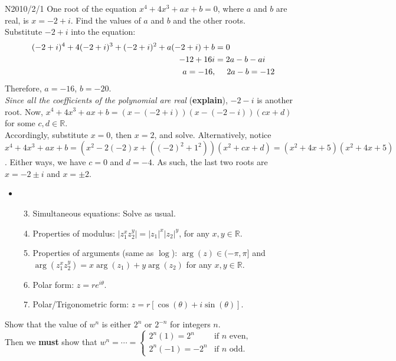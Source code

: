 \documentclass[oneside]{book}
\begin{document}
        \begin{example}{N2010/2/1}{}
          One root of the equation \(x^4+4x^3+ax+b=0\), where \(a\) and \(b\) are real, is \(x=-2+i\). Find the values of \(a\) and \(b\) and the other roots.\\[3mm]
          Substitute \(-2+i\) into the equation:
          \begin{align*}
            (-2+i)^4+4(-2+i)^3+(-2+i)^2+a(-2+i)+b&=0\\
            -12+16i&=2a-b-ai\\
            a=-16, &\hphantom{=}\ \ 2a-b=-12
          \end{align*}
          Therefore, \(a=-16\), \(b=-20\).\\[3mm]
          \emph{Since all the coefficients of the polynomial are real} (\textbf{explain}), \(-2-i\) is another root. Now, \(x^4+4x^3+ax+b=(x-(-2+i))(x-(-2-i))(cx+d)\) for some \(c,d \in \mathbb{R}\).\\[3mm]
          Accordingly, substitute \(x=0\), then \(x=2\), and solve. Alternatively, notice \(x^4+4x^3+ax+b=(x^2-2(-2)x+((-2)^2+1^2))(x^2+cx+d)=(x^2+4x+5)(x^2+4x+5)\). Either ways, we have \(c=0\) and \(d=-4\). As such, the last two roots are \(x=-2 \pm i\) and \(x=\pm 2\). 
        \end{example}
      \begin{stbox}{}
        \begin{itemize}[label=\hphantom{1.}]
          \item
          \begin{enumerate}[label=(\alph*)]
            \setcounter{enumi}{2}
            \item Simultaneous equations: Solve as usual.
            \item Properties of modulus: \(\lvert z_1^xz_2^y \rvert=\lvert z_1 \rvert^x \lvert z_2 \rvert^y\), for any \(x,y \in \mathbb{R}\).
            \item Properties of arguments (same as \(\log\)): \(\arg(z) \in (-\pi,\pi]\) and \(\arg(z_1^xz_2^y)=x\arg(z_1)+y\arg(z_2)\) for any \(x,y \in \mathbb{R}\).
            \item Polar form: \(z=re^{i\theta}\).
            \item Polar/Trigonometric form: \(z=r[\cos(\theta)+i\sin(\theta)]\).
          \end{enumerate}
        \end{itemize}
  \end{stbox}
  \begin{note}
    Show that the value of \(w^n\) is either \(2^n\) or \(2^{-n}\) for integers \(n\).\\[3mm]
    Then we \textbf{must} show that \(w^n=\cdots=\begin{cases}
      2^n(1)=2^n&\text{if }n\text{ even},\\
      2^n(-1)=-2^n&\text{if }n\text{ odd}.
    \end{cases}\) 
  \end{note}
\end{document}
